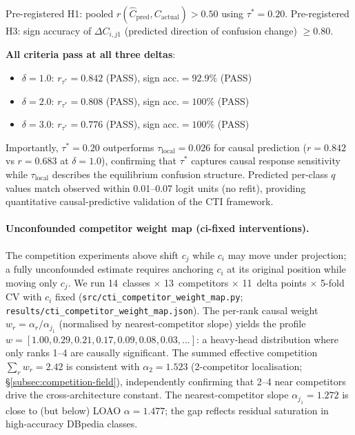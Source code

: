 \documentclass{article}
\begin{document}
Pre-registered H1: pooled $r(\hat{C}_{\mathrm{pred}}, C_{\mathrm{actual}})>0.50$ using $\tau^*=0.20$.
Pre-registered H3: sign accuracy of $\Delta C_{i,j1}$ (predicted direction of confusion change)
$\geq 0.80$.

\textbf{All criteria pass at all three deltas}:
\begin{itemize}[nosep]
  \item $\delta=1.0$: $r_{\tau^*}=0.842$ (PASS), sign acc.$=92.9\%$ (PASS)
  \item $\delta=2.0$: $r_{\tau^*}=0.808$ (PASS), sign acc.$=100\%$ (PASS)
  \item $\delta=3.0$: $r_{\tau^*}=0.776$ (PASS), sign acc.$=100\%$ (PASS)
\end{itemize}

Importantly, $\tau^*=0.20$ outperforms $\tau_\mathrm{local}=0.026$ for causal prediction
($r=0.842$ vs $r=0.683$ at $\delta=1.0$), confirming that $\tau^*$ captures causal response
sensitivity while $\tau_\mathrm{local}$ describes the equilibrium confusion structure.
Predicted per-class $q$ values match observed within 0.01--0.07 logit units (no refit),
providing quantitative causal-predictive validation of the CTI framework.

\paragraph{Unconfounded competitor weight map (ci-fixed interventions).}
\label{para:weight-map}
The competition experiments above shift $c_j$ while $c_i$ may move under projection; a
fully unconfounded estimate requires anchoring $c_i$ at its original position while moving
only $c_j$.
We run 14~classes $\times$ 13~competitors $\times$ 11~delta points $\times$ 5-fold CV with
$c_i$ fixed (\texttt{src/cti\_competitor\_weight\_map.py};
\texttt{results/cti\_competitor\_weight\_map.json}).
The per-rank causal weight $w_r = \alpha_r / \alpha_{j_1}$ (normalised by nearest-competitor
slope) yields the profile $w = [1.00, 0.29, 0.21, 0.17, 0.09, 0.08, 0.03, \ldots]$:
a heavy-head distribution where only ranks 1--4 are causally significant.
The summed effective competition $\sum_r w_r = 2.42$ is consistent with $\alpha_2=1.523$
(2-competitor localisation; \S\ref{subsec:competition-field}), independently confirming that 2--4 near competitors
drive the cross-architecture constant.
The nearest-competitor slope $\alpha_{j_1} = 1.272$ is close to (but below) LOAO
$\alpha=1.477$; the gap reflects residual saturation in high-accuracy DBpedia classes.
\end{document}
